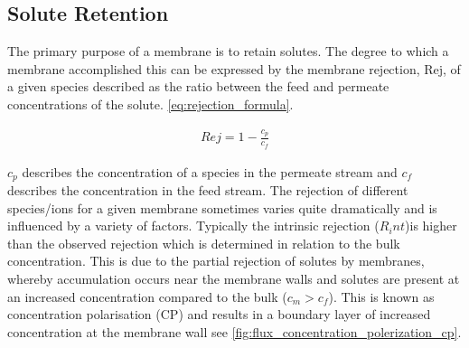 

\subsection{Solute Retention }
The primary purpose of a membrane is to retain solutes. 
The degree to which a membrane accomplished this can be expressed by the membrane rejection, Rej, of a given species described as the ratio between the feed and permeate concentrations of the solute. \cref{eq:rejection_formula}.
\begin{ceqn}
    \begin{align}
    \label{eq:rejection_formula}
       Rej = 1 - \frac{c_p}{c_f} 
    \end{align}
\end{ceqn}
$c_p$ describes the concentration of a species in the permeate stream and $c_f$ describes the concentration in the feed stream. 
The rejection of different species/ions for a given membrane sometimes varies quite dramatically and is influenced by a variety of factors.
Typically the intrinsic rejection ($R_int$)is higher than the observed rejection which is determined in relation to the bulk concentration.  
This is due to the partial rejection of solutes by membranes, whereby accumulation occurs near the membrane walls and solutes are present at an increased concentration compared to the bulk ($c_m > c_f$).
This is known as concentration polarisation (CP) and results in a boundary layer of increased concentration at the membrane wall see \cref{fig:flux_concentration_polerization_cp}.

